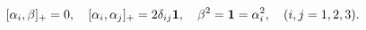 \begin{equation}
\label{AM}
[\alpha_{i}, \beta ]_{+}= 0, \quad [\alpha _{i}, \alpha _{j}]_{+}=
2\delta_{ij} {\bf 1}, \quad \beta ^{2}=
{\bf 1} = \alpha^{2}_{i}, \quad (i,j=1,2,3).
\end{equation}

